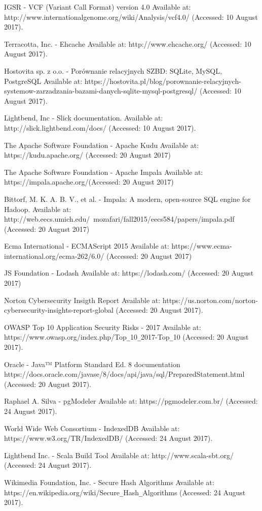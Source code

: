 \documentclass[a4paper,12pt,twoside]{article}
\begin{document}
\begin{thebibliography}{99}
IGSR  - VCF (Variant Call Format) version 4.0
Available at: http://www.internationalgenome.org/wiki/Analysis/vcf4.0/ (Accessed: 10 August 2017).

Terracotta, Inc. - Ehcache 
Available at: http://www.ehcache.org/ (Accessed: 10 August 2017).

Hostovita sp. z o.o. - Porównanie relacyjnych SZBD: SQLite, MySQL, PostgreSQL
Available at:
https://hostovita.pl/blog/porownanie-relacyjnych-systemow-zarzadzania-bazami-danych-sqlite-mysql-postgresql/ (Accessed: 10 August 2017).

Lightbend, Inc - Slick documentation. Available at:
http://slick.lightbend.com/docs/ (Accessed: 10 August 2017).

The Apache Software Foundation - Apache Kudu Available at:
https://kudu.apache.org/ (Accessed: 20 August 2017)

The Apache Software Foundation - Apache Impala Available at:
https://impala.apache.org/(Accessed: 20 August 2017)

Bittorf, M. K. A. B. V., et al. - Impala: A modern, open-source SQL engine for Hadoop.
Available at: http://web.eecs.umich.edu/~mozafari/fall2015/eecs584/papers/impala.pdf (Accessed: 20 August 2017)

Ecma International - ECMAScript 2015
Available at: https://www.ecma-international.org/ecma-262/6.0/ (Accessed: 20 August 2017)

JS Foundation - Lodash
Available at: https://lodash.com/ (Accessed: 20 August 2017)

Norton Cybersecurity Insigth Report 
Available at: https://us.norton.com/norton-cybersecurity-insights-report-global (Accessed: 20 August 2017).

OWASP Top 10 Application Security Risks - 2017 Available at: 
https://www.owasp.org/index.php/Top\verb!_!10\verb!_!2017-Top\verb!_!10 (Accessed: 20 August 2017).

Oracle - Java™ Platform Standard Ed. 8 documentation
https://docs.oracle.com/javase/8/docs/api/java/sql/PreparedStatement.html (Accessed: 20 August 2017).

Raphael A. Silva - pgModeler Available at: https://pgmodeler.com.br/
(Accessed: 24 August 2017).

World Wide Web Consortium - IndexedDB Available at: https://www.w3.org/TR/IndexedDB/
(Accessed: 24 August 2017).

Lightbend Inc. - Scala Build Tool 
 Available at: http://www.scala-sbt.org/
(Accessed: 24 August 2017).

Wikimedia Foundation, Inc.  - Secure Hash Algorithms 
Available at: https://en.wikipedia.org/wiki/Secure\verb!_!Hash\verb!_!Algorithms
(Accessed: 24 August 2017).
\end{thebibliography}
\end{document}
